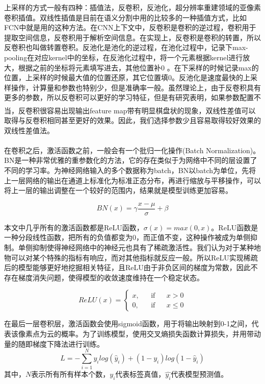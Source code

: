 \documentclass[10pt]{ctexart}
\newcommand{\upcite}[1]{\textsuperscript{\textsuperscript{\cite{#1}}}}
\begin{document}
\begin{multicols}{2}
\begin{table}[H]
    \label{BiomeFlag}
    \end{table}

上采样的方式一般有四种：插值法，反卷积，反池化，超分辨率重建领域的亚像素卷积插值。双线性插值是目前在语义分割中用的比较多的一种插值方式，比如FCN中就是用的这种方法。在CNN上下文中，反卷积是卷积的逆过程，卷积用于提取空间信息，反卷积用于解析空间信息。在实现上，反卷积是卷积的转置，所以反卷积也叫做转置卷积。反池化是池化的逆过程，在池化过程中，记录下max-pooling在对应kernel中的坐标，在反池化过程中，将一个元素根据kernel进行放大，根据之前的坐标将元素填写进去，其他位置补0 。在下采样的时候记录max的位置，上采样的时候最大值的位置还原，其它位置填0。反池化是速度最快的上采样操作，计算量和参数也特别少，但是准确率一般。虽然理论上，由于反卷积具有更多的参数，所以反卷积可以更好的学习特征，但是有研究表明，如果参数配置不当，反卷积很容易出现输出feature map带有明显棋盘状的现象\upcite{odena2016deconvolution}，双线性差值可以取得与反卷积相同甚至更好的效果。因此，我们选择参数少且容易取得较好效果的双线性差值法。


在卷积之后，激活函数之前，一般会有一个批归一化操作\upcite{ioffe2015batch}(Batch Normalization)。BN是一种非常优雅的重参数化的方法，它的存在类似于为网络中不同的层设置了不同的学习率。为神经网络输入的多个数据称为batch，BN以batch为单位，先将上一层网络的输出在通道上标准化为标准正态分布，再进行缩放与平移操作，可以将上一层的输出调整在一个较好的范围内，结果就是模型训练更加容易。

\begin{equation}
    BN(x) = \gamma\frac{x-\mu}{\sigma}+\beta
\end{equation}

本文中几乎所有的激活函数都是ReLU函数，$\sigma(x)=max(0,x)$。ReLU函数是一种分段线性函数，把所有的负值都变为0，而正值不变，这种操作被成为单侧抑制。单侧抑制使得神经网络中的神经元也具有了稀疏激活性。我们认为对于某种地物可以对某个特殊的指标有响应，而对其他指标就反应一般。所以ReLU实现稀疏后的模型能够更好地挖掘相关特征，且ReLU由于非负区间的梯度为常数，因此不存在梯度消失问题，使得模型的收敛速度维持在一个稳定状态。

\begin{equation}
    ReLU(x)=\left\{
    \begin{aligned}
        x, & &\text{if} & & x > 0 \\
        0, & &\text{if} & & x \leq 0
    \end{aligned}
    \right.
\end{equation}

在最后一层卷积层，激活函数会使用sigmoid函数，用于将输出映射到0-1之间，代表该像素点为云的概率。为了训练模型，使用交叉熵损失函数计算损失，并用带动量的随即梯度下降法进行训练。
\begin{equation}
    L = -\sum_{i=1}^N y_ilog(\hat{y}_i)+(1-y_i)log(1-\hat{y}_i)
\end{equation}
其中，$N$表示所有所有样本个数，$y_i$代表标签真值，$\hat{y_i}$代表模型预测值。


\end{multicols}
\end{document}
